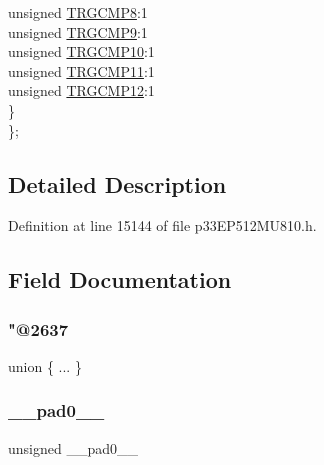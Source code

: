 \begin{DoxyCompactItemize}
\begin{tabbing}
\>\>unsigned \hyperlink{structtag_t_r_i_g5_b_i_t_s_a7d4f3ec40334f00592eb7247457e2fd6}{TRGCMP8}:1\\
\>\>unsigned \hyperlink{structtag_t_r_i_g5_b_i_t_s_a0001e7efb9031bef24e7a19100d11b0b}{TRGCMP9}:1\\
\>\>unsigned \hyperlink{structtag_t_r_i_g5_b_i_t_s_a768e63198a56962df16bcaaf9084f379}{TRGCMP10}:1\\
\>\>unsigned \hyperlink{structtag_t_r_i_g5_b_i_t_s_a8a82ad80802491f065113055f2a059e2}{TRGCMP11}:1\\
\>\>unsigned \hyperlink{structtag_t_r_i_g5_b_i_t_s_a2bc8969a57c3dbec6828f3bda9ebc1fd}{TRGCMP12}:1\\
\>\} \\
\}; \\

\end{tabbing}\end{DoxyCompactItemize}


\subsection{Detailed Description}


Definition at line 15144 of file p33\+E\+P512\+M\+U810.\+h.



\subsection{Field Documentation}
\mbox{\label{structtag_t_r_i_g5_b_i_t_s_a0f0258b45865b5dd627e338713a6ef26}} 
\subsubsection{\texorpdfstring{"@2637}{@2637}}
{\footnotesize\ttfamily union \{ ... \} }

\mbox{\label{structtag_t_r_i_g5_b_i_t_s_adf71f3d8410c1f1dbbc96680a92c49af}} 
\subsubsection{\texorpdfstring{\+\_\+\+\_\+pad0\+\_\+\+\_\+}{\_\_pad0\_\_}}
{\footnotesize\ttfamily unsigned \+\_\+\+\_\+pad0\+\_\+\+\_\+}



